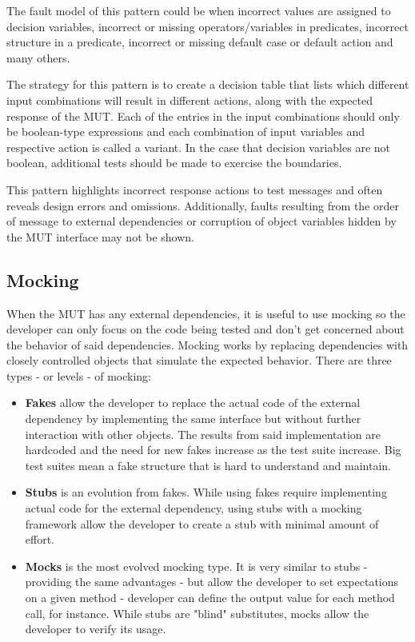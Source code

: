 \documentclass{sigchi}
\begin{document}
The fault model of this pattern could be when incorrect values are assigned to decision variables, incorrect or missing operators/variables in predicates, incorrect structure in a predicate, incorrect or missing default case or default action and many others.

The strategy for this pattern is to create a decision table that lists which different input combinations will result in different actions, along with the expected response of the MUT. Each of the entries in the input combinations should only be boolean-type expressions and each combination of input variables and respective action is called a variant. In the case that decision variables are not boolean, additional tests should be made to exercise the boundaries.

This pattern highlights incorrect response actions to test messages and often reveals design errors and omissions. Additionally, faults resulting from the order of message to external dependencies or corruption of object variables hidden by the MUT interface may not be shown.

\subsection{Mocking}
When the MUT has any external dependencies, it is useful to use mocking so the developer can only focus on the code being tested and don't get concerned about the behavior of said dependencies. Mocking works by replacing dependencies with closely controlled objects that simulate the expected behavior. There are three types - or levels - of mocking:
\begin{itemize}
    \item \textbf{Fakes} allow the developer to replace the actual code of the external dependency by implementing the same interface but without further interaction with other objects. The results from said implementation are hardcoded and the need for new fakes increase as the test suite increase. Big test suites mean a fake structure that is hard to understand and maintain.
    \item \textbf{Stubs} is an evolution from fakes. While using fakes require implementing actual code for the external dependency, using stubs with a mocking framework allow the developer to create a stub with minimal amount of effort.
    \item \textbf{Mocks} is the most evolved mocking type. It is very similar to stubs - providing the same advantages - but allow the developer to set expectations on a given method - developer can define the output value for each method call, for instance. While stubs are "blind" substitutes, mocks allow the developer to verify its usage.
\end{itemize}
\end{document}
